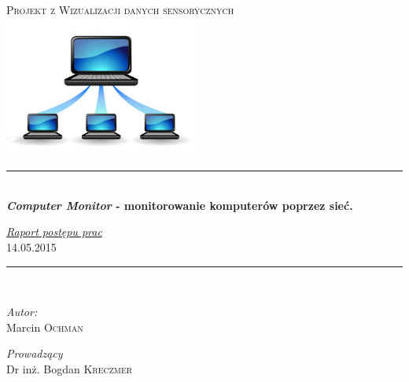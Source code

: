 \begin{titlepage}
\begin{center}

 \newcommand{\HRule}{\rule{\linewidth}{0.5mm}}

\textsc{\Large Projekt z Wizualizacji danych sensorycznych}\\[1cm]

\includegraphics{network_icon}


\HRule \\[0.4cm]
{ \huge \bfseries \textit{Computer Monitor} - monitorowanie komputerów poprzez sieć.\\[0.4cm] }

{\huge \underline{\textit{Raport postępu prac }}}\\[0.5cm]


\LARGE 14.05.2015
\HRule \\[1.5cm]


\noindent
\begin{minipage}[t]{0.4\textwidth}
\begin{flushleft} \large
\emph{Autor:}\\
Marcin \textsc{Ochman}
\end{flushleft}
\end{minipage}%
\begin{minipage}[t]{0.4\textwidth}
\begin{flushright} \large
\emph{Prowadzący} \\
Dr inż. Bogdan \textsc{Kreczmer}
\end{flushright}
\end{minipage}


\end{center}
\end{titlepage}